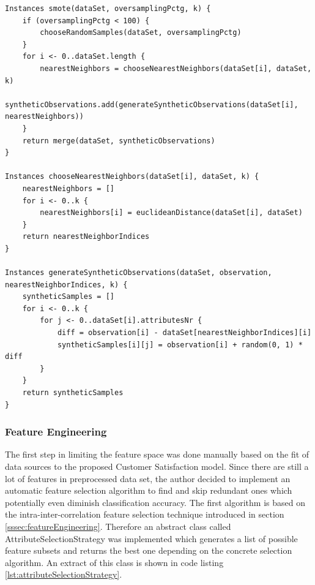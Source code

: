 \begin{lstlisting}[caption={SMOTE algorithm in pseudo code}, label={lst:smote}]
Instances smote(dataSet, oversamplingPctg, k) {
	if (oversamplingPctg < 100) {
		chooseRandomSamples(dataSet, oversamplingPctg)
	}
	for i <- 0..dataSet.length {
		nearestNeighbors = chooseNearestNeighbors(dataSet[i], dataSet, k)
		syntheticObservations.add(generateSyntheticObservations(dataSet[i], nearestNeighbors))
	}
	return merge(dataSet, syntheticObservations)
}

Instances chooseNearestNeighbors(dataSet[i], dataSet, k) {
	nearestNeighbors = []
	for i <- 0..k {
		nearestNeighbors[i] = euclideanDistance(dataSet[i], dataSet)
	}
	return nearestNeighborIndices
}

Instances generateSyntheticObservations(dataSet, observation, nearestNeighborIndices, k) {
	syntheticSamples = []
	for i <- 0..k {
		for j <- 0..dataSet[i].attributesNr {
			diff = observation[i] - dataSet[nearestNeighborIndices][i]
			syntheticSamples[i][j] = observation[i] + random(0, 1) * diff
		}
	}
	return syntheticSamples
}
\end{lstlisting}

\subsubsection{Feature Engineering}
The first step in limiting the feature space was done manually based on the fit of data sources to the proposed Customer Satisfaction model. Since there are still a lot of features in preprocessed data set, the author decided to implement an automatic feature selection algorithm to find and skip redundant ones which potentially even diminish classification accuracy. The first algorithm is based on the intra-inter-correlation feature selection technique introduced in section \ref{sssec:featureEngineering}. Therefore an abstract class called AttributeSelectionStrategy was implemented which generates a list of possible feature subsets and returns the best one depending on the concrete selection algorithm. An extract of this class is shown in code listing \ref{lst:attributeSelectionStrategy}.

